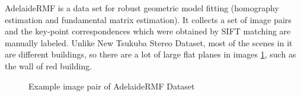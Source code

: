 AdelaideRMF is a data set for robust geometric model fitting (homography estimation and fundamental matrix estimation). It collects a set of image pairs and the key-point correspondences which were obtained by SIFT matching are manually labeled\cite{wongDynamicHierarchicalMultistructure2011}. Unlike New Tsukuba Stereo Dataset, most of the scenes in it are different buildings, so there are a lot of large flat planes in images \cref{fig:ladysmomo}, such as the wall of red building.
\begin{figure}[htbp]\centering
	 \hspace{-2mm}
	\caption{Example image pair of AdelaideRMF Dataset \cite{wongDynamicHierarchicalMultistructure2011}}
	\label{fig:ladysmomo}
\end{figure}

